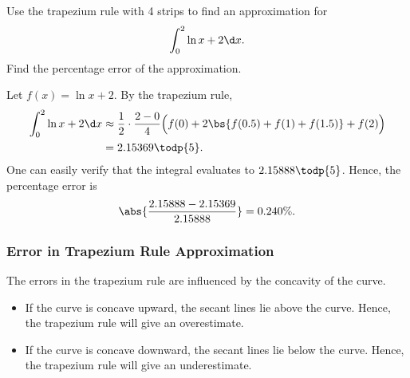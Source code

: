 \begin{sample}\label{samp:Trapezium-Rule}
    Use the trapezium rule with 4 strips to find an approximation for \[\int_0^2 \ln{x + 2} \d x.\] Find the percentage error of the approximation.
\end{sample}
\begin{sampans}
    Let $f(x) = \ln{x+2}$. By the trapezium rule,
    \begin{align*}
        \int_0^2 \ln{x + 2} \d x &\approx \frac{1}{2} \cdot \frac{2 - 0}{4} \Big(f(0) + 2\bs{f(0.5) + f(1) + f(1.5)} + f(2)\Big) \\
        &= 2.15369 \todp{5}.
    \end{align*}
    One can easily verify that the integral evaluates to $2.15888 \todp{5}$. Hence, the percentage error is \[\abs{\frac{2.15888 - 2.15369}{2.15888}} = 0.240 \%.\]
\end{sampans}

\subsubsection{Error in Trapezium Rule Approximation}

The errors in the trapezium rule are influenced by the concavity of the curve.
\begin{itemize}
    \item If the curve is concave upward, the secant lines lie above the curve. Hence, the trapezium rule will give an overestimate.
    \item If the curve is concave downward, the secant lines lie below the curve. Hence, the trapezium rule will give an underestimate.
\end{itemize}

